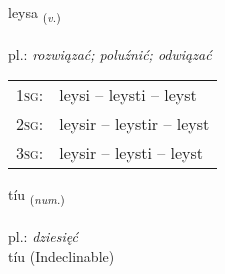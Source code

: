\documentclass[frontgrid, backgrid]{flacards}\usepackage[]{graphicx}\usepackage[]{xcolor}
\begin{document}
\renewcommand{\flhead}{\vskip5pt \fboxsep=0pt {\small\bfseries\footnotesize Sagnorð | Verb}}
\renewcommand{\fcfoot}{\vskip5pt \fboxsep=0pt \hspace{2pt}{\small\bfseries\footnotesize 1K}}

\renewcommand{\blhead}{\vskip5pt {\small\bfseries\footnotesize Sagnorð | Verb }}
\renewcommand{\bcfoot}{\vskip5pt \hspace{2pt}{\small\bfseries\footnotesize 1K}}


{leysa \small{\textsubscript{(\textit{v.})}} \\[1ex] %
\textphonetic{[leiːsa]} \\
pl.: \emph{rozwiązać; poluźnić; odwiązać} \\  [2ex]
\renewcommand*{\arraystretch}{0.8}
\begin{tabular}{p{1cm}l}
\textsc{1sg}: & leysi -- leysti -- leyst \\ 
\textsc{2sg}: & leysir -- leystir -- leyst \\ 
\textsc{3sg}: & leysir -- leysti -- leyst \\ 
\end{tabular}
}


\renewcommand{\flhead}{\vskip5pt \fboxsep=0pt {\small\bfseries\footnotesize Töluorð | Numeral}}
\renewcommand{\fcfoot}{\vskip5pt \fboxsep=0pt \hspace{2pt}{\small\bfseries\footnotesize 1K}}

\renewcommand{\blhead}{\vskip5pt {\small\bfseries\footnotesize Töluorð | Numeral }}
\renewcommand{\bcfoot}{\vskip5pt \hspace{2pt}{\small\bfseries\footnotesize 1K}}


{tíu \small{\textsubscript{(\textit{num.})}} \\[1ex]
\textphonetic{[tʰijʏ]} \\
pl.: \emph{dziesięć} \\  [2ex]
tíu (Indeclinable)}

\renewcommand{\flhead}{\vskip5pt \fboxsep=0pt {\small\bfseries\footnotesize Lýsingarorð | Adjective}}
\renewcommand{\fcfoot}{\vskip5pt \fboxsep=0pt \hspace{2pt}{\small\bfseries\footnotesize 1K}}
\end{document}
